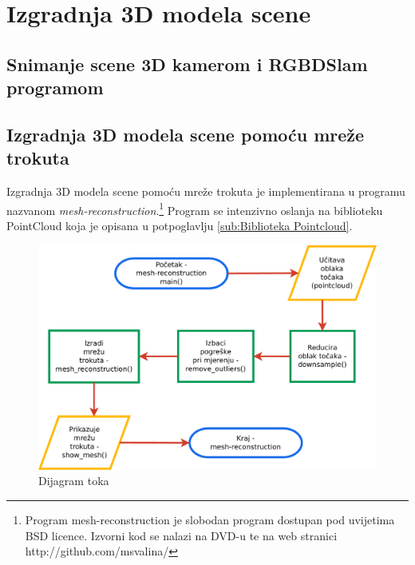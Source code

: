 \newpage

\section{Izgradnja 3D modela scene} %
\label{sec:Izgradnja 3D modela scene}

\subsection{Snimanje scene 3D kamerom i RGBDSlam programom} %
\label{sub:Snimanje scene 3D kamerom i RGBDSlam programom}

\subsection{Izgradnja 3D modela scene pomoću mreže trokuta} %
\label{sub:Izgradnja 3D modela scene pomoću mreže trokuta}

Izgradnja 3D modela scene pomoću mreže trokuta je implementirana u
programu nazvanom \textit{mesh-reconstruction}.\footnote{
Program mesh-reconstruction je slobodan program dostupan pod
uvijetima BSD licence. Izvorni kod se nalazi na DVD-u te na web stranici
http://github.com/msvalina/}      
Program se intenzivno oslanja na biblioteku PointCloud koja je opisana u
potpoglavlju \ref{sub:Biblioteka Pointcloud}.

\begin{figure}[h]
\centering
\includegraphics[scale=0.4]{figures/flowchart.pdf}
\caption{Dijagram toka}
\label{fig:{flowchart.pdf}}
\end{figure}


